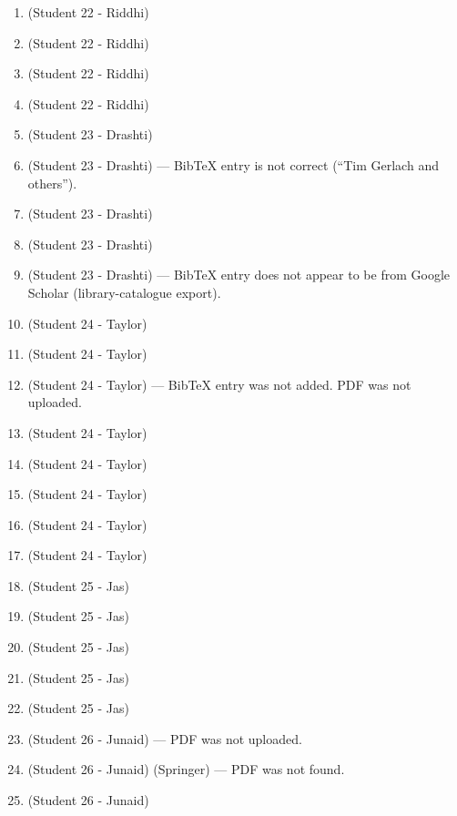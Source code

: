 \documentclass{article}
\begin{document}
\begin{enumerate}[label=\#\arabic*,noitemsep,nolistsep]
\item \cite{scheinerman2001determining} (Student 22 - Riddhi)
\item \cite{sakata1988finding} (Student 22 - Riddhi)
\item \cite{sakata1981determining} (Student 22 - Riddhi)
\item \cite{pudwell2014debruijn} (Student 22 - Riddhi)
\item \cite{anisiu2006twodimensional} (Student 23 - Drashti)
\item \cite{gerlach2026shorthand} (Student 23 - Drashti) --- BibTeX entry is not correct (``Tim Gerlach and others'').
\item \cite{tinker2017debruijn} (Student 23 - Drashti)
\item \cite{stojkovic2019pseudorandom} (Student 23 - Drashti)
\item \cite{alma992340821905151} (Student 23 - Drashti) --- BibTeX entry does not appear to be from Google Scholar (library-catalogue export).
\item \cite{ivanyi1988construction} (Student 24 - Taylor)
\item \cite{paterson1996new} (Student 24 - Taylor)
\item \cite{costa2019tour} (Student 24 - Taylor) --- BibTeX entry was not added. PDF was not uploaded. %
\item \cite{carey2025universal} (Student 24 - Taylor)
\item \cite{hurlbert1990universal} (Student 24 - Taylor)
\item \cite{west2005comparison} (Student 24 - Taylor)
\item \cite{roig2024applying} (Student 24 - Taylor)
\item \cite{chee2019binary} (Student 24 - Taylor)
\item \cite{etzion2025bruijn} (Student 25 - Jas)
\item \cite{horan2016locating} (Student 25 - Jas)
\item \cite{mitchell1995aperiodic} (Student 25 - Jas)
\item \cite{luke1988sequences} (Student 25 - Jas)
\item \cite{isaak2002constructions} (Student 25 - Jas)
\item \cite{makarov2019construction} (Student 26 - Junaid) --- PDF was not uploaded.
\item \cite{heindl2023py} (Student 26 - Junaid) (Springer) --- PDF was not found.
\item \cite{hostettler2016real} (Student 26 - Junaid)

\end{enumerate}
\end{document}
